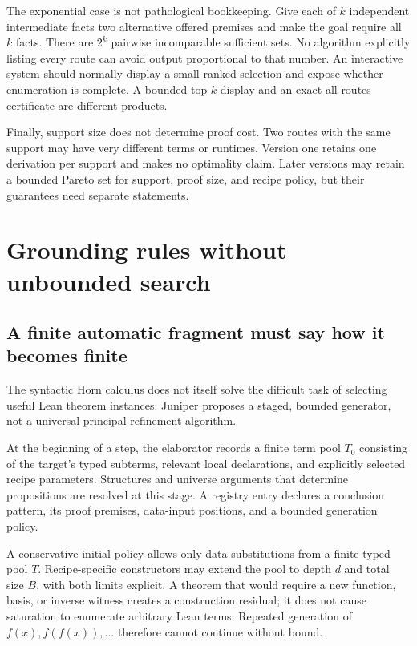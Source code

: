 \documentclass[11pt,a4paper]{article}
\theoremstyle{definition}\newtheorem{definition}[theorem]{Definition}
\theoremstyle{remark}\newtheorem{remark}[theorem]{Remark}
\begin{document}
The exponential case is not pathological bookkeeping. Give each of $k$ independent intermediate facts two alternative offered premises and make the goal require all $k$ facts. There are $2^k$ pairwise incomparable sufficient sets. No algorithm explicitly listing every route can avoid output proportional to that number. An interactive system should normally display a small ranked selection and expose whether enumeration is complete. A bounded top-$k$ display and an exact all-routes certificate are different products.

Finally, support size does not determine proof cost. Two routes with the same support may have very different terms or runtimes. Version one retains one derivation per support and makes no optimality claim. Later versions may retain a bounded Pareto set for support, proof size, and recipe policy, but their guarantees need separate statements.

\section{Grounding rules without unbounded search}
\label{sec:grounding}
\subsection{A finite automatic fragment must say how it becomes finite}
The syntactic Horn calculus does not itself solve the difficult task of selecting useful Lean theorem instances. Juniper proposes a staged, bounded generator, not a universal principal-refinement algorithm.

At the beginning of a step, the elaborator records a finite term pool $T_0$ consisting of the target's typed subterms, relevant local declarations, and explicitly selected recipe parameters. Structures and universe arguments that determine propositions are resolved at this stage. A registry entry declares a conclusion pattern, its proof premises, data-input positions, and a bounded generation policy.

A conservative initial policy allows only data substitutions from a finite typed pool $T$. Recipe-specific constructors may extend the pool to depth $d$ and total size $B$, with both limits explicit. A theorem that would require a new function, basis, or inverse witness creates a construction residual; it does not cause saturation to enumerate arbitrary Lean terms. Repeated generation of $f(x),f(f(x)),\ldots$ therefore cannot continue without bound.
\end{document}
